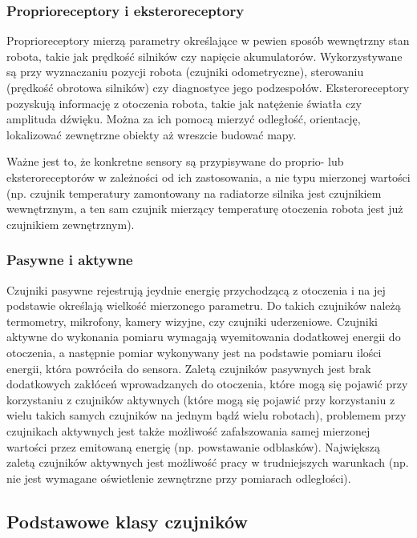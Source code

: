 \subsubsection{Proprioreceptory i eksteroreceptory}

Proprioreceptory mierzą parametry określające w pewien sposób wewnętrzny stan
robota, takie jak prędkość silników czy napięcie akumulatorów. Wykorzystywane są
przy wyznaczaniu pozycji robota (czujniki odometryczne), sterowaniu (prędkość
obrotowa silników) czy diagnostyce jego podzespołów. Eksteroreceptory
pozyskują informację z otoczenia robota, takie jak natężenie
światła czy amplituda dźwięku. Można za ich pomocą mierzyć odległość,
orientację, lokalizować zewnętrzne obiekty aż wreszcie budować mapy.

Ważne jest to, że konkretne sensory są przypisywane do proprio- lub
eksteroreceptorów w zależności od ich zastosowania, a nie typu mierzonej
wartości (np. czujnik temperatury zamontowany na radiatorze silnika jest
czujnikiem wewnętrznym, a ten sam czujnik mierzący temperaturę otoczenia robota
jest już czujnikiem zewnętrznym).

\subsubsection{Pasywne i aktywne}

Czujniki pasywne rejestrują jeydnie energię przychodzącą z otoczenia i na
jej podstawie określają wielkość mierzonego parametru. Do takich czujników
należą termometry, mikrofony, kamery wizyjne, czy czujniki uderzeniowe.
Czujniki aktywne do wykonania pomiaru wymagają wyemitowania dodatkowej energii
do otoczenia, a następnie pomiar wykonywany jest na podstawie pomiaru ilości
energii, która powróciła do sensora. Zaletą czujników pasywnych jest brak
dodatkowych zakłóceń wprowadzanych do otoczenia, które mogą się pojawić
przy korzystaniu z czujników aktywnych (które mogą się pojawić przy korzystaniu
z wielu takich samych czujników na jednym bądź wielu robotach), problemem
przy czujnikach aktywnych jest także możliwość zafałszowania samej mierzonej
wartości przez emitowaną energię (np. powstawanie odblasków). Największą zaletą
czujników aktywnych jest możliwość pracy w trudniejszych warunkach (np. nie
jest wymagane oświetlenie zewnętrzne przy pomiarach odległości).

\subsection{Podstawowe klasy czujników}

